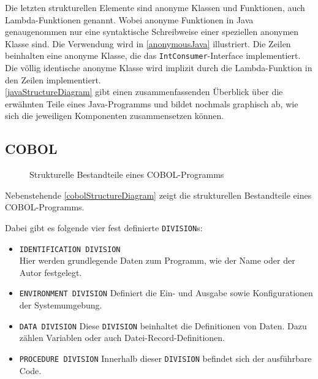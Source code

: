 
Die letzten strukturellen Elemente sind anonyme Klassen und Funktionen, auch Lambda-Funktionen genannt. Wobei anonyme Funktionen in Java genaugenommen nur eine syntaktische Schreibweise einer speziellen anonymen Klasse sind. Die Verwendung wird in \autoref{anonymousJava} illustriert. Die Zeilen  beinhalten eine anonyme Klasse, die das \texttt{IntConsumer}-Interface implementiert. Die völlig identische  anonyme Klasse wird implizit durch die Lambda-Funktion in den Zeilen  implementiert.\\

\autoref{javaStructureDiagram} gibt einen zusammenfassenden Überblick über die erwähnten Teile eines Java-Programms und bildet nochmals graphisch ab, wie sich die jeweiligen Komponenten zusammensetzen können.\\

\subsection*{COBOL}
{

\begin{wrapfigure}{l}{.5\textwidth}
\centering

\caption{Strukturelle Bestandteile eines COBOL-Programms\label{cobolStructureDiagram}}
\end{wrapfigure}
Nebenstehende \autoref{cobolStructureDiagram} zeigt die strukturellen Bestandteile eines COBOL-Programms. 

Dabei gibt es folgende vier fest definierte \texttt{DIVISION}s:
\begin{itemize}
    \item \texttt{IDENTIFICATION DIVISION}\\
    Hier werden grundlegende Daten zum Programm, wie der Name oder der Autor festgelegt.
    \item \texttt{ENVIRONMENT DIVISION}
    Definiert die Ein- und Ausgabe sowie Konfigurationen der Systemumgebung.
    \item \texttt{DATA DIVISION}
    Diese \texttt{DIVISION} beinhaltet die Definitionen von Daten. Dazu zählen Variablen oder auch Datei-Record-Definitionen.
    \item \texttt{PROCEDURE DIVISION}
    Innerhalb dieser \texttt{DIVISION} befindet sich der ausführbare Code.
\end{itemize}


}


